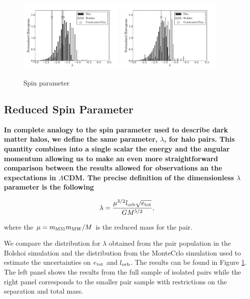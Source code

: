 \documentclass{emulateapj}
\begin{document}
\begin{figure}
\begin{center}
\includegraphics[keepaspectratio=true,width=0.46\textwidth]{./figures/test_lambda.pdf}
\includegraphics[keepaspectratio=true,width=0.46\textwidth]{./figures/test_lambda_narrow.pdf}
\caption{Spin parameter}
\label{fig:lambda}
\end{center}
\end{figure}



\subsection{Reduced Spin Parameter}

{\bf In complete analogy to the spin parameter used to describe dark matter halos, we define the same parameter, $\lambda$, for halo pairs. This quantity combines into a single scalar the energy and the angular momentum allowing us to make an even more straightforward comparison between the results allowed for observations an the expectations in $\Lambda$CDM. The precise definition of the dimensionless $\lambda$ parameter is the following
}

\begin{equation}
\lambda = \frac{\mu^{3/2} l_{\rm orb} \sqrt{e_{\rm tot}}}{G M^{5/2}}, 
\end{equation}

where the $\mu=m_{\rm M31}m_{\rm MW}/M$ is the reduced mass for the pair.


We compare the distribution for  $\lambda$ obtained from the pair population in the Bolshoi simulation and the distribution from the MonteCrlo simulation used to estimate the uncertainties on $e_{\rm tot}$ and $l_{\rm orb}$. The results can be found in Figure \ref{fig:lambda}. The left panel shows the results from the full sample of isolated pairs while the right panel corresponds to the smaller pair sample with restrictions on the separation and total mass. 
\end{document}
